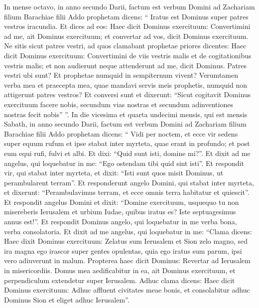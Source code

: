 \begin{biblechapter}
 \verse In mense octavo, in anno secundo Darii, factum est verbum Domini ad Zachariam filium Barachiae filii Addo prophetam dicens: 
\verse “ Iratus est Dominus super patres vestros iracundia. 
\verse Et dices ad eos: Haec dicit Dominus exercituum: Convertimini ad me, ait Dominus exercituum; et convertar ad vos, dicit Dominus exercituum. 
\verse Ne sitis sicut patres vestri, ad quos clamabant prophetae priores dicentes: Haec dicit Dominus exercituum: Convertimini de viis vestris malis et de cogitationibus vestris malis; et non audierunt neque attenderunt ad me, dicit Dominus. 
\verse Patres vestri ubi sunt? Et prophetae numquid in sempiternum vivent? 
\verse Verumtamen verba mea et praecepta mea, quae mandavi servis meis prophetis, numquid non attigerunt patres vestros? Et conversi sunt et dixerunt: “Sicut cogitavit Dominus exercituum facere nobis, secundum vias nostras et secundum adinventiones nostras fecit nobis” ”.
 \verse In die vicesima et quarta undecimi mensis, qui est mensis Sabath, in anno secundo Darii, factum est verbum Domini ad Zachariam filium Barachiae filii Addo prophetam dicens: 
\verse “ Vidi per noctem, et ecce vir sedens super equum rufum et ipse stabat inter myrteta, quae erant in profundo; et post eum equi rufi, fulvi et albi. 
\verse Et dixi: “Quid sunt isti, domine mi?”. Et dixit ad me angelus, qui loquebatur in me: “Ego ostendam tibi quid sint isti”. 
\verse Et respondit vir, qui stabat inter myrteta, et dixit: “Isti sunt quos misit Dominus, ut perambularent terram”. 
\verse Et responderunt angelo Domini, qui stabat inter myrteta, et dixerunt: “Perambulavimus terram, et ecce omnis terra habitatur et quiescit”.
 \verse Et respondit angelus Domini et dixit: “Domine exercituum, usquequo tu non misereberis Ierusalem et urbium Iudae, quibus iratus es? Iste septuagesimus annus est!”. 
\verse Et respondit Dominus angelo, qui loquebatur in me verba bona, verba consolatoria. 
\verse Et dixit ad me angelus, qui loquebatur in me: “Clama dicens: Haec dixit Dominus exercituum: Zelatus sum Ierusalem et Sion zelo magno, 
\verse sed ira magna ego irascor super gentes opulentas, quia ego iratus sum parum, ipsi vero adiuverunt in malum. 
\verse Propterea haec dicit Dominus: Revertar ad Ierusalem in misericordiis. Domus mea aedificabitur in ea, ait Dominus exercituum, et perpendiculum extendetur super Ierusalem. 
\verse Adhuc clama dicens: Haec dicit Dominus exercituum: Adhuc affluent civitates meae bonis, et consolabitur adhuc Dominus Sion et eliget adhuc Ierusalem”.
 

\end{biblechapter}
